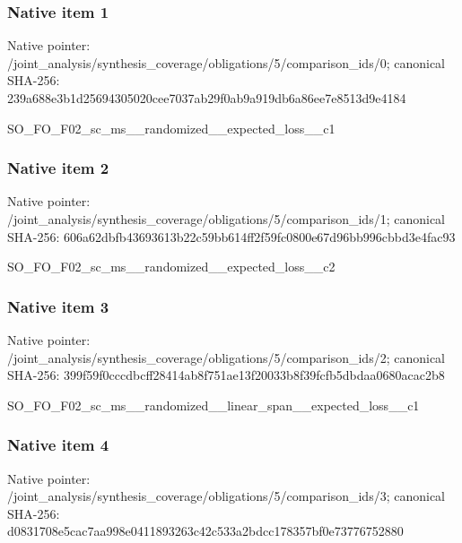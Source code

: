 \documentclass[10pt,a4paper]{article}
\begin{document}
\subsubsection{Native item 1}
Native pointer: /joint\_\allowbreak{}analysis/synthesis\_\allowbreak{}coverage/obligations/5/comparison\_\allowbreak{}ids/0; canonical SHA-256: 239a688e3b1d25694305020cee7037ab29f0ab9a919db6a86ee7e8513d9e4184

\begingroup\raggedright\sloppy SO\_\allowbreak{}FO\_\allowbreak{}F02\_\allowbreak{}sc\_\allowbreak{}ms\_\allowbreak{}\_\allowbreak{}randomized\_\allowbreak{}\_\allowbreak{}expected\_\allowbreak{}loss\_\allowbreak{}\_\allowbreak{}c1\par\endgroup

\subsubsection{Native item 2}
Native pointer: /joint\_\allowbreak{}analysis/synthesis\_\allowbreak{}coverage/obligations/5/comparison\_\allowbreak{}ids/1; canonical SHA-256: 606a62dbfb43693613b22c59bb614ff2f59fc0800e67d96bb996cbbd3e4fac93

\begingroup\raggedright\sloppy SO\_\allowbreak{}FO\_\allowbreak{}F02\_\allowbreak{}sc\_\allowbreak{}ms\_\allowbreak{}\_\allowbreak{}randomized\_\allowbreak{}\_\allowbreak{}expected\_\allowbreak{}loss\_\allowbreak{}\_\allowbreak{}c2\par\endgroup

\subsubsection{Native item 3}
Native pointer: /joint\_\allowbreak{}analysis/synthesis\_\allowbreak{}coverage/obligations/5/comparison\_\allowbreak{}ids/2; canonical SHA-256: 399f59f0cccdbcff28414ab8f751ae13f20033b8f39fcfb5dbdaa0680acac2b8

\begingroup\raggedright\sloppy SO\_\allowbreak{}FO\_\allowbreak{}F02\_\allowbreak{}sc\_\allowbreak{}ms\_\allowbreak{}\_\allowbreak{}randomized\_\allowbreak{}\_\allowbreak{}linear\_\allowbreak{}span\_\allowbreak{}\_\allowbreak{}expected\_\allowbreak{}loss\_\allowbreak{}\_\allowbreak{}c1\par\endgroup

\subsubsection{Native item 4}
Native pointer: /joint\_\allowbreak{}analysis/synthesis\_\allowbreak{}coverage/obligations/5/comparison\_\allowbreak{}ids/3; canonical SHA-256: d0831708e5cac7aa998e0411893263c42c533a2bdcc178357bf0e73776752880
\end{document}
